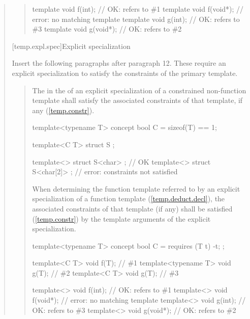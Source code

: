 \begin{quote}
\begin{quote}
\begin{addedblock}
\begin{codeblock}
template void f(int);   // OK: refers to \#1
template void f(void*); // error: no matching template
template void g(int);   // OK: refers to \#3
template void g(void*); // OK: refers to \#2
\end{codeblock}
\exitexample
\end{addedblock}
\end{quote}


[temp.expl.spec]{Explicit specialization}

Insert the following paragraphs after paragraph 12. These require
an explicit specialization to satisfy the constraints of the primary
template.

\begin{quote}
\begin{addedblock}
\setcounter{Paras}{12}
\pnum
The  in the
 of an explicit 
specialization of a constrained non-function template shall satisfy the 
associated constraints of that template, if any 
(\ref{temp.constr}).
% 
\enterexample
\begin{codeblock}
template<typename T> concept bool C = sizeof(T) == 1;

template<C T> struct S { };

template<> struct S<char> { };    // OK
template<> struct S<char[2]> { }; // error: constraints not satisfied
\end{codeblock}
\exitexample

\pnum
When determining the function template referred to by an explicit 
specialization of a function template (\ref{temp.deduct.decl}),
the associated constraints of that template (if any) shall be satisfied 
(\ref{temp.constr}) by the template arguments of the explicit specialization.

\enterexample
\begin{codeblock}
template<typename T> concept bool C = requires (T t) { -t; };

template<C T>        void f(T); // \#1
template<typename T> void g(T); // \#2
template<C T>        void g(T); // \#3

template<> void f(int);   // OK: refers to \#1
template<> void f(void*); // error: no matching template
template<> void g(int);   // OK: refers to \#3
template<> void g(void*); // OK: refers to \#2
\end{codeblock}
\exitexample
\end{addedblock}
\end{quote}



\end{quote}
